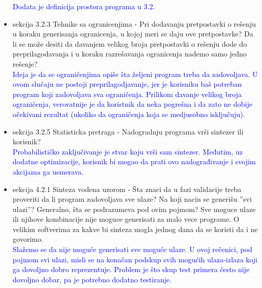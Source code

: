 \documentclass[a4paper]{report}
\newcommand{\odgovor}[1]{\textcolor{blue}{#1}}
\begin{document}
\begin{itemize}
    \odgovor {Dodata je definicija prostora programa u 3.2.}
    \item sekcija 3.2.3 Tehnike sa ogranicenjima - Pri dodavanju pretpostavki o rešenju u koraku generisanja ogranicenja, u kojoj meri se daju ove pretpostavke? Da li se može desiti da davanjem velikog broja pretpostavki o rešenju dode do preprilagodavanja i u koraku razrešavanja ogranicenja nademo samo jedno rešenje?\\
    \odgovor {Ideja je da se ograničenjima opiše šta željeni program treba da zadovoljava. U ovom slučaju ne postoji preprilagodjavanje, jer je korisniku baš potreban program koji zadovoljava sva ograničenja. Prilikom davanje velikog broja ograničenja, verovatnije je da koristnik da neka pogrešna i da zato ne dobije očekivani rezultat (ukoliko da ograničenja koja se medjusobno isključuju).}
    \item sekcija 3.2.5 Statisticka pretraga - Nadogradnju programa vrši sintezer ili korisnik?\\
    \odgovor {Probabilističko zaključivanje je stvar koju vrši sam sintezer. Međutim, uz dodatne optimizacije, korisnik bi mogao da prati ovo nadograđivanje i svojim akcijama ga usmerava.}
    \item sekcija 4.2.1 Sinteza vodena uzorom - Šta znaci da u fazi validacije treba proveriti da li program zadovoljava sve ulaze? Na koji nacin se generišu ''svi ulazi''? Generalno, šta se podrazumeva pod ovim pojmom? Sve moguce ulaze ili njihove kombinacije nije moguce generisati za malo vece programe. O velikim softverima za kakve bi sinteza mogla jednog dana da se koristi da i ne govorimo.\\
	\odgovor{Slažemo se da nije moguće generisati sve moguće ulaze. U ovoj rečenici, pod pojmom svi ulazi, misli se na konačan podskup svih mogućih ulaza-izlaza koji ga dovoljno dobro reprezentuje. Problem je što skup test primera često nije dovoljno dobar, pa je potrebno dodatno testiranje.}
\end{itemize}
\end{document}
